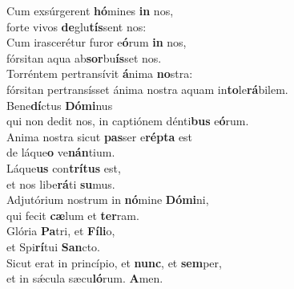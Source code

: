 \evenverse Cum exsúrgerent \textbf{hó}mines \textbf{in} nos,~\*\\
\evenverse forte vivos \textbf{de}glu\textbf{tís}sent nos:\\
\oddverse Cum irascerétur furor e\textbf{ó}rum \textbf{in} nos,~\*\\
\oddverse fórsitan aqua ab\textbf{sor}bu\textbf{ís}set nos.\\
\evenverse Torréntem pertransívit \textbf{á}nima \textbf{no}stra:~\*\\
\evenverse fórsitan pertransísset ánima nostra aquam in\textbf{to}le\textbf{rá}bilem.\\
\oddverse Bene\textbf{dí}ctus \textbf{Dó}\textbf{mi}nus~\*\\
\oddverse qui non dedit nos, in captiónem dénti\textbf{bus} e\textbf{ó}rum.\\
\evenverse Anima nostra sicut \textbf{pas}ser e\textbf{rép}\textbf{ta} est~\*\\
\evenverse de láque\textbf{o} ve\textbf{nán}tium.\\
\oddverse Láque\textbf{us} con\textbf{trí}\textbf{tus} est,~\*\\
\oddverse et nos libe\textbf{rá}ti \textbf{su}mus.\\
\evenverse Adjutórium nostrum in \textbf{nó}mine \textbf{Dó}\textbf{mi}ni,~\*\\
\evenverse qui fecit \textbf{cæ}lum et \textbf{ter}ram.\\
\oddverse Glória \textbf{Pa}tri, et \textbf{Fí}\textbf{li}o,~\*\\
\oddverse et Spi\textbf{rí}tui \textbf{San}cto.\\
\evenverse Sicut erat in princípio, et \textbf{nunc}, et \textbf{sem}per,~\*\\
\evenverse et in sǽcula sæcu\textbf{ló}rum. \textbf{A}men.\\

